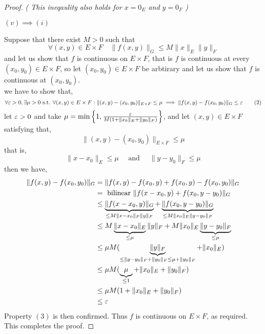 \begin{proof}
\it( This ineqaulity also holds for $x = 0_{E} $ and $y = 0_{F} $ ) \normalfont
\begin{center}
	$(v)  \implies (i)  $ 
\end{center}
Suppose that there exist $M > 0 $  such that 
\[
\forall  (x,y)  \in  E \times F  \quad 
\| f(x,y)  \| _{G} \leq M \| x \| _{E}  \| y \| _{F}
\]
and let us show that $f $ is continuous on $E \times F  $, that is $f $ is 
continuous at every $(x_0,y_0)  \in  E \times F  $, so let 
$(x_0, y_0) \in  E \times F   $  be arbtirary and let us show that $f $ is continuous
at $(x_0, y_0)  $. \\
we have to show that, 
\[
\forall  \varepsilon > 0, \exists  \mu  > 0 \text{ s.t. }  
\forall (x,y) \in  E \times F : 
\| (x,y) - (x_0,y_0)  \| _{E \times F } 
\leq \mu  \implies 
\| f(x,y) - f(x_0,y_0)   \|_{G} \leq \varepsilon \quad \quad  (2) 
\]
let $\varepsilon  > 0 $ and take $\mu  = \min \left\{ 1, \frac{ \varepsilon }{M(1+\| x_0 \| _{E} + 
\| y_0 \| _{F}) } \right\} $, and let $(x,y)  \in  E \times F  $  satisfying that, 
\[
\| (x,y) - (x_0,y_0)  \|  _{E \times F } \leq \mu 
\]
that is, 
\[
\| x-x_0 \| _{E} \leq \mu  \quad \text{ and }  \quad 
\| y-y_0 \|  _{F} \leq \mu 
\]
then we have, 
\begin{align*}
	\| f(x,y) - f(x_0,y_0)  \|  _{G}  
	&= 
\|  f(x,y)- f(x_0,y) + f(x_0,y) - f(x_0,y_0)  \| _{G} \\
	&=\text{ bilinear } 
	\|  f(x-x_0, y) + f(x_0, y-y_0)  \| _{G} \\
	& \leq 
	\underbrace{
	\| f(x-x_0, y)  \| _{G}
	}_{ \leq M \| x-x_0 \|_{F} \| y \| _{F}} 
	+ 
	\underbrace{
	\| f(x_0,y-y_0)  \| _{G}
	}_{ \leq  M \| x_0 \| _{E} \| y-y_0 \| _{F}}  \\
	& \leq 
	M 
	\underbrace{
	\| x-x_0 \| _{E} 
	}_{ \leq  \mu } 
	\| y \| _{F} 
	+ 
	M \| x_0 \| _{E} 
	\underbrace{
	\| y-y_0 \| _{F}
	}_{ \leq  \mu } 
     \\ & \leq  \mu  M (
     \underbrace{
     \| y \| _{F} 
     }_{ \leq  \| y-y_0 \| _{F} + \| y_0 \| _{F} \leq \mu  + \| y_0 \| _{F}} 
     + \| x_0 \| _{E})  \\
	& \leq  \mu M ( \underbrace{
		\mu 
	}_{ \leq 1}   + \| x_0 \| _{E} + \| y_0 \| _{F})  \\
	&\leq  \mu  M (1 + \| x_0 \| _{E}+ \| y_0 \| _{F})  \\
	& \leq \varepsilon 
\end{align*}
Property $(3)$ is then confirmed. Thus $f $ is continuous on $E \times F  $, as required.\\
This completes the proof. 
\end{proof}
